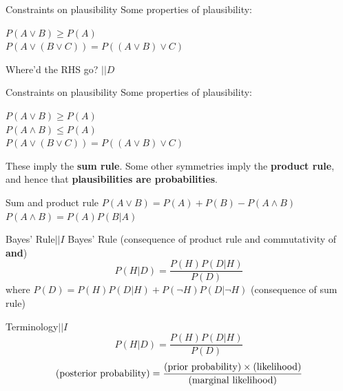 \documentclass{beamer}
\begin{document}
\begin{frame}[t]{Constraints on plausibility}
Some properties of plausibility:\vspace{20pt}

$P(A \vee B) \geq P(A)$\\
$P(A \vee (B \vee C)) = P((A \vee B) \vee C)$\vspace{20pt}

Where'd the RHS go? $|| D$
\end{frame}

\begin{frame}[t]{Constraints on plausibility}
Some properties of plausibility:\vspace{20pt}

$P(A \vee B) \geq P(A)$\\
$P(A \wedge B) \leq P(A)$\\
$P(A \vee (B \vee C)) = P((A \vee B) \vee C)$\vspace{20pt}

These imply the {\bf sum rule}.
Some other symmetries imply the {\bf product rule}, and hence that
{\bf plausibilities are probabilities}.
\end{frame}

\begin{frame}[t]{Sum and product rule}
$P(A \vee B) = P(A) + P(B) - P(A \wedge B)$\\
\vspace{20pt}
$P(A \wedge B) = P(A)P(B|A)$
\end{frame}

\begin{frame}[t]{Bayes' Rule\hspace{170pt}$|| I$}
Bayes' Rule (consequence of product rule and commutativity of {\bf and})
\begin{equation}
P(H | D) = \frac{P(H)P(D|H)}{P(D)}
\end{equation}
where\vspace{20pt}
$P(D) = P(H)P(D | H) + P(\neg H)P(D | \neg H)$
(consequence of sum rule)
\end{frame}

\begin{frame}[t]{Terminology\hspace{170pt}$|| I$}
\begin{equation}
P(H | D) = \frac{P(H)P(D|H)}{P(D)}
\end{equation}
\begin{equation}
\textnormal{(posterior probability)} =
\frac{\textnormal{(prior probability)}\times\textnormal{(likelihood)}}{\textnormal{(marginal likelihood)}}
\end{equation}
\end{frame}
\end{document}
